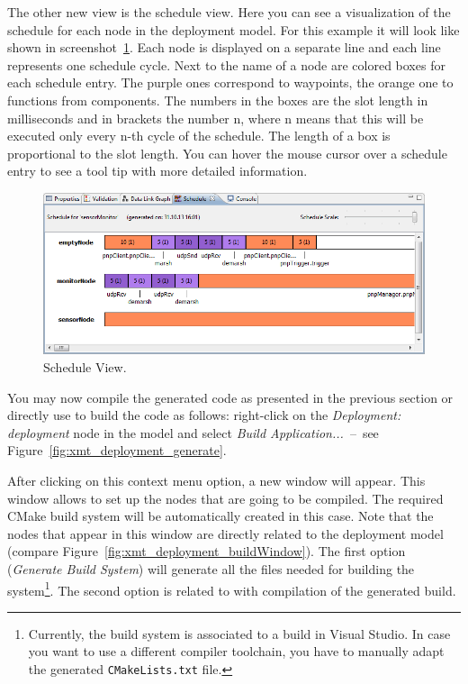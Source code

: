 The other new view is the schedule view.
Here you can see a visualization of the schedule for each node in the deployment model.
For this example it will look like shown in screenshot~\ref{fig:xmt_scheduleView}.
Each node is displayed on a separate line and each line represents one schedule cycle.
Next to the name of a node are colored boxes for each schedule entry.
The purple ones correspond to waypoints, the orange one to functions from components.
The numbers in the boxes are the slot length in milliseconds
and in brackets the number n, where n means that this will be executed only every n-th cycle of the schedule.
The length of a box is proportional to the slot length.
You can hover the mouse cursor over a schedule entry to see a tool tip with more detailed information.

\begin{figure}[ht]
	\centering
	\includegraphics[scale=0.75]{figures/xmt_scheduleView.png}
	\caption{Schedule View.}
	\label{fig:xmt_scheduleView}
\end{figure}

You may now compile the generated code as presented in the previous section or directly use \xmt to build the code as follows:
right-click on the \emph{Deployment: deployment} node in the model
and select \emph{Build Application...}~--~see Figure~\ref{fig:xmt_deployment_generate}.

After clicking on this context menu option, a new window will appear.
This window allows to set up the nodes that are going to be compiled.
The required CMake build system will be automatically created in this case.
%
Note that the nodes that appear in this window are directly related to the deployment model (compare Figure~\ref{fig:xmt_deployment_buildWindow}).
The first option (\emph{Generate Build System}) will generate all the files needed for building the system\footnote{%
	Currently, the build system is associated to a build in Visual Studio.
	In case you want to use a different compiler toolchain, you have to manually adapt the generated \texttt{CMakeLists.txt} file.
}.
The second option is related to with compilation of the generated build.

